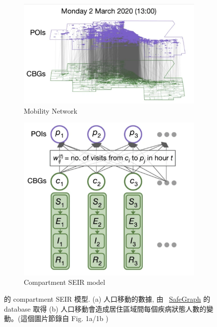 
\begin{figure}[htb]
\centering 

\begin{subfigure}[b]{0.4\textwidth}
    \includegraphics[width=\textwidth]{fig/chang_model/mobility-map.png}
     \caption{Mobility Network}
     \label{fig:chmod-mobility}
\end{subfigure} 
\begin{subfigure}[b]{0.3\textwidth}
    \includegraphics[width=\textwidth]{fig/chang_model/poi-cbg.png}
    \caption{Compartment SEIR model}
    \label{fig:chmod-seir}
\end{subfigure}

\caption{\citeauthor{mobility2020} 的 compartment SEIR 模型. (a) 人口移動的數據, 由 ~\href{https://www.safegraph.com/}{SafeGraph} 的 database 取得 (b) 人口移動會造成居住區域間每個疾病狀態人數的變動。(這個圖片節錄自 Fig. 1a/1b \cite{mobility2020}) }

\label{fig:chmod}

\end{figure}